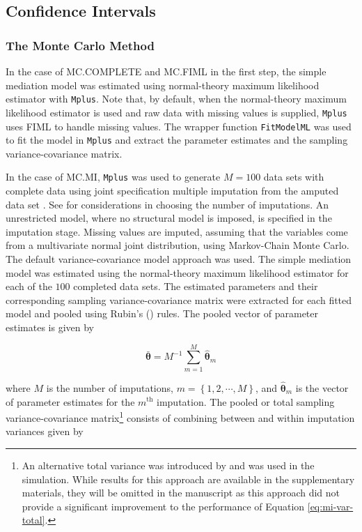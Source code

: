 \documentclass[man]{apa7}\usepackage[]{graphicx}\usepackage[]{xcolor}
\begin{document}
\subsection{Confidence Intervals}

\subsubsection{The Monte Carlo Method}

In the case of MC.COMPLETE and MC.FIML
in the first step,
the simple mediation model was estimated using normal-theory maximum likelihood estimator with \texttt{Mplus}.
Note that, by default, when the normal-theory maximum likelihood estimator is used and raw data with missing values is supplied, \texttt{Mplus} uses FIML to handle missing values.
The wrapper function \texttt{FitModelML} was used to fit the model in \texttt{Mplus} and extract the parameter estimates and the sampling variance-covariance matrix.

In the case of MC.MI,
\texttt{Mplus} was used to generate $M = 100$ data sets with complete data using joint specification multiple imputation from the amputed data set 
\parencite{Lib-Missing-Data-Multiple-Imputation-Asparouhov-2022}.
See
\Textcite{Lib-Missing-Data-Multiple-Imputation-Graham-2007}
for considerations in choosing the number of imputations.
An unrestricted model, where no structural model is imposed, is specified in the imputation stage.
Missing values are imputed, assuming that the variables come from a multivariate normal joint distribution,
using Markov-Chain Monte Carlo.
The default variance-covariance model approach was used.
The simple mediation model was estimated using the normal-theory maximum likelihood estimator for each of the $100$ completed data sets.
The estimated parameters and their corresponding sampling variance-covariance matrix were extracted for each fitted model and pooled using Rubin's (\citeyear{Lib-Missing-Data-Books-Rubin-1987})
rules.
The pooled vector of parameter estimates is given by

\begin{equation}
    \bar{\boldsymbol{\theta}}
    =
    M^{-1}
    \sum_{m = 1}^{M}
    \hat{\boldsymbol{\theta}}_{m}
\end{equation}

\noindent where $M$ is the number of imputations,
$m = \left\{ 1, 2, \cdots, M \right\}$,
and
$\hat{\boldsymbol{\theta}}_{m}$
is the vector of parameter estimates for the $m^{\mathrm{th}}$ imputation.
The pooled or total sampling variance-covariance matrix\footnote{An alternative total variance was introduced by
\Textcite{Lib-Missing-Data-Multiple-Imputation-Li-1991} and was used in the simulation.
While results for this approach are available in the supplementary materials,
they will be omitted in the manuscript as this approach did not provide a significant improvement to the performance of Equation \ref{eq:mi-var-total}.}
consists of combining between and within imputation variances
given by
\end{document}
